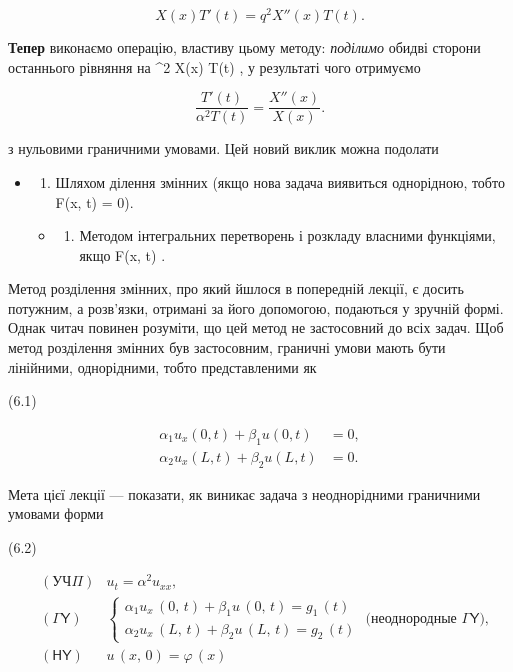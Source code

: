 \documentclass[
  ukrainian,
]{article}
\providecommand{\tightlist}{%
  \setlength{\itemsep}{0pt}\setlength{\parskip}{0pt}}
\begin{document}
\[
X(x) T'(t) = q^2 X''(x) T(t).
\]

\textbf{Тепер} виконаємо операцію, властиву цьому методу:
\emph{поділимо} обидві сторони останнього рівняння на \alpha\^{}2 X(x)
T(t) , у результаті чого отримуємо

\[
\frac{T'(t)}{\alpha^2 T(t)} = \frac{X''(x)}{X(x)}.
\]

з нульовими граничними умовами. Цей новий виклик можна подолати

\begin{itemize}
\item
  \begin{enumerate}
  \def\labelenumi{\arabic{enumi}.}
  \tightlist
  \item
    Шляхом ділення змінних (якщо нова задача виявиться однорідною, тобто
    F(x, t) = 0).
  \end{enumerate}

  \begin{itemize}
  \tightlist
  \item
    \begin{enumerate}
    \def\labelenumi{\arabic{enumi}.}
    \setcounter{enumi}{1}
    \tightlist
    \item
      Методом інтегральних перетворень і розкладу власними функціями,
      якщо F(x, t)  .
    \end{enumerate}
  \end{itemize}
\end{itemize}

Метод розділення змінних, про який йшлося в попередній лекції, є досить
потужним, а розв'язки, отримані за його допомогою, подаються у зручній
формі. Однак читач повинен розуміти, що цей метод не застосовний до всіх
задач. Щоб метод розділення змінних був застосовним, граничні умови
мають бути лінійними, однорідними, тобто представленими як

(6.1)

\[
\begin{aligned} \alpha_1 u_x(0, t) + \beta_1 u(0, t) &= 0, \\ \alpha_2 u_x(L, t) + \beta_2 u(L, t) &= 0. \end{aligned}
\]

Мета цієї лекції --- показати, як виникає задача з неоднорідними
граничними умовами форми

(6.2)

\[
\begin{aligned} & (\mathsf{У}\mathsf{Ч}\Pi) & u_t = \alpha^2 u_{xx}, \\ & (\mathsf{\Gamma}\mathsf{Y}) & \begin{cases} \alpha_1 u_x \, (0, \, t) + \beta_1 u \, (0, \, t) = g_1 \, (t) \\ \alpha_2 u_x \, (L, \, t) + \beta_2 u \, (L, \, t) = g_2 \, (t) \end{cases} \text{ (неоднородные } \mathsf{\Gamma}\mathsf{Y}), \\ & (\mathsf{H}\mathsf{Y}) & u \, (x, \, 0) = \varphi \, (x) \end{aligned}
\]
\end{document}
